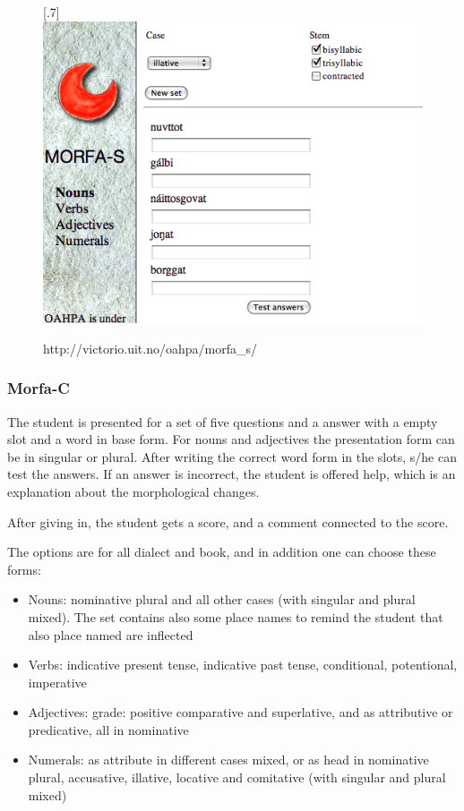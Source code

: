 \documentclass[a4paper,12pt]{article}
\begin{document}
\begin{figure}[htbp]
\begin{center}
\scalebox{.7}[.7]{\includegraphics{img/morfaS.png}}\\
\caption{http://victorio.uit.no/oahpa/morfa\_s/}
\label{morfas}
\end{center}
\end{figure}


\subsubsection{Morfa-C}
The student is presented for a set of five questions and a answer with a empty slot and a word in base form. For nouns and adjectives the presentation form can be in singular or plural. After writing the correct word form in the slots, s/he can test the answers. If an answer is incorrect, the student is offered help, which is an explanation about the morphological changes.

After giving in, the student gets a score, and a comment connected to the score. 

The options are for all dialect and book, and in addition one can choose these forms:
\begin{itemize}
\item Nouns: nominative plural and all other cases (with singular and plural mixed). The set contains also some place names to remind the student that also place named are inflected
\item Verbs: indicative present tense, indicative past tense, conditional, potentional, imperative
\item Adjectives: grade: positive comparative and superlative, and as attributive or predicative, all in nominative
\item Numerals: as attribute in different cases mixed, or as head in nominative plural, accusative, illative, locative and comitative (with singular and plural mixed)
\end{itemize}
\vspace{0.5cm}
\end{document}
